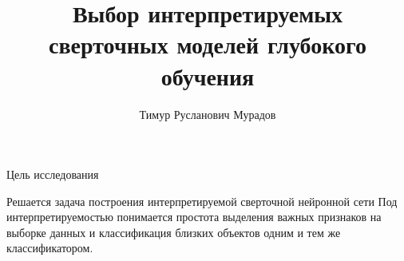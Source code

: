 \documentclass{beamer}
\title[\hbox to 56mm{Интерпретируемые CNN}]{Выбор интерпретируемых \\ сверточных моделей глубокого обучения}
\author[Т.\,Р. Мурадов]{Тимур Русланович Мурадов}
\institute{Московский физико-технический институт}
\date{\footnotesize
\par\smallskip\emph{Курс:} Моя первая научная статья\par (В.\,В.~Стрижов)/Группа Б05-907б
\par\smallskip\emph{Консультант:} О.~Бахтеев
\par\smallskip\emph{Консультант:} К.~Яковлев
\par\bigskip\small 2022}
\begin{document}
\begin{frame}
\thispagestyle{empty}
\maketitle
\end{frame}
\begin{frame}{Цель исследования}
	\begin{block}{Решается задача построения интерпретируемой сверточной нейронной сети}
	Под интерпретируемостью понимается простота выделения важных признаков на выборке данных и классификация близких объектов одним и тем же классификатором. 
	\end{block}
\end{frame}
\end{document}
